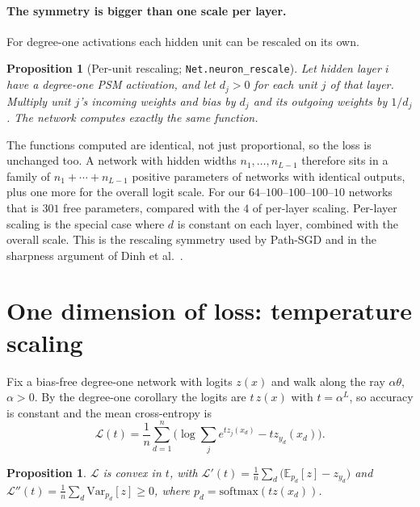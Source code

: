 \documentclass[11pt]{article}
\newtheorem{proposition}[theorem]{Proposition}
\theoremstyle{definition}
\theoremstyle{remark}
\newcommand{\lean}[1]{\texttt{\color{black!70}#1}}
\begin{document}
\paragraph{The symmetry is bigger than one scale per layer.}
For degree-one activations each hidden unit can be rescaled on its own.

\begin{proposition}[Per-unit rescaling; \lean{Net.neuron\_rescale}]\label{prop:neuron}
Let hidden layer $i$ have a degree-one PSM activation, and let $d_j>0$ for each unit $j$ of that
layer. Multiply unit $j$'s incoming weights and bias by $d_j$ and its outgoing weights by $1/d_j$.
The network computes exactly the same function.
\end{proposition}

The functions computed are identical, not just proportional, so the loss is unchanged too. A
network with hidden widths $n_1,\dots,n_{L-1}$ therefore sits in a family of
$n_1+\cdots+n_{L-1}$ positive parameters of networks with identical outputs, plus one more for the
overall logit scale. For our $64$--$100$--$100$--$100$--$10$ networks that is $301$ free
parameters, compared with the $4$ of per-layer scaling. Per-layer scaling is the special case where
$d$ is constant on each layer, combined with the overall scale. This is the rescaling symmetry used by Path-SGD
\cite{neyshabur2015path} and in the sharpness argument of Dinh et al.~\cite{dinh2017sharp}.

\section{One dimension of loss: temperature scaling}\label{sec:ray}

Fix a bias-free degree-one network with logits $z(x)$ and walk along the ray $\alpha\theta$,
$\alpha>0$. By the degree-one corollary the logits are $t\,z(x)$ with $t=\alpha^L$, so accuracy is
constant and the mean cross-entropy is
\[
  \mathcal{L}(t) = \frac1n\sum_{d=1}^n\Big(\log\sum_j e^{t z_j(x_d)} - t z_{y_d}(x_d)\Big).
\]
\begin{proposition}\label{prop:convex}
$\mathcal{L}$ is convex in $t$, with
$\mathcal{L}'(t)=\frac1n\sum_d\big(\mathbb{E}_{p_d}[z]-z_{y_d}\big)$ and
$\mathcal{L}''(t)=\frac1n\sum_d\mathrm{Var}_{p_d}[z]\ge0$, where $p_d=\mathrm{softmax}(t z(x_d))$.
\end{proposition}
\end{document}
